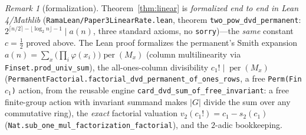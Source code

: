 \documentclass[11pt]{article}
\theoremstyle{remark}\newtheorem{remark}[theorem]{Remark}
\DeclareMathOperator{\perm}{per}
\begin{document}
\begin{remark}[formalization]
Theorem~\ref{thm:linear} is \emph{formalized end to end in Lean 4/Mathlib}
(\texttt{RamaLean/Paper3LinearRate.lean}, theorem \texttt{two\_pow\_dvd\_permanent}:
$2^{\lceil n/2\rceil-\lfloor\log_2 n\rfloor-1}\mid a(n)$, three standard axioms, no
\texttt{sorry})---the \emph{same} constant $c=\tfrac12$ proved above. The Lean proof formalizes
the permanent's Smith expansion $a(n)=\sum_x\bigl(\prod_i\varphi(x_i)\bigr)\perm(M_x)$
(column multilinearity via \texttt{Finset.prod\_univ\_sum}), the all-ones-column divisibility
$c_1!\mid\perm(M_x)$ (\texttt{PermanentFactorial.factorial\_dvd\_permanent\_of\_ones\_rows},
a free \texttt{Perm(Fin }$c_1$\texttt{)} action, from the reusable engine
\texttt{card\_dvd\_sum\_of\_free\_invariant}: a free finite-group action with invariant summand
makes $|G|$ divide the sum over any commutative ring), the \emph{exact} factorial valuation
$v_2(c_1!)=c_1-s_2(c_1)$ (\texttt{Nat.sub\_one\_mul\_factorization\_factorial}), and the
$2$-adic bookkeeping.
\end{remark}
\end{document}
